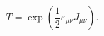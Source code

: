 \begin{equation}
T=\exp \left( \frac 12\varepsilon _{\mu \nu }J_{\mu \nu }\right) .
\label{49}
\end{equation}

